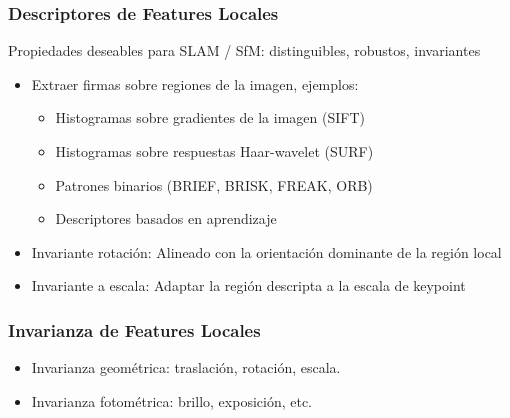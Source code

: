 \begin{frame}
	\frametitle{Descriptores de Features Locales}
	\footnotesize
	
	Propiedades deseables para SLAM / SfM: distinguibles, robustos, invariantes
	\begin{itemize}
		\item Extraer firmas sobre regiones de la imagen, ejemplos:
		\begin{itemize}
			\item Histogramas sobre gradientes de la imagen (SIFT)
			\item Histogramas sobre respuestas Haar-wavelet (SURF)
			\item Patrones binarios (BRIEF, BRISK, FREAK, ORB)
			\item Descriptores basados en aprendizaje
		\end{itemize}
		\item Invariante rotación: Alineado con la orientación dominante de la región local
		\item Invariante a escala: Adaptar la región descripta a la escala de keypoint
	\end{itemize}

    \begin{figure}[!h]
		\hspace{1cm}
	\end{figure}
	
\end{frame}

\begin{frame}
	\frametitle{Invarianza de Features Locales}
	\footnotesize
	
	\begin{itemize}
		\item Invarianza geométrica: traslación, rotación, escala.
		\item Invarianza fotométrica: brillo, exposición, etc.
	\end{itemize}
	 

\end{frame}

